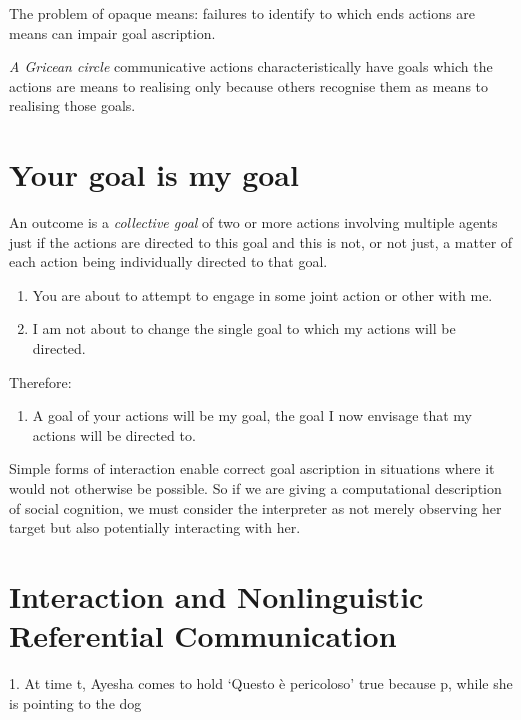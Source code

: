 \documentclass[12pt]{extarticle}
\begin{document}
\begin{multicols*}{3}
The problem of opaque means:
failures to identify to which ends actions are means can impair goal ascription.

\emph{A Gricean circle}
communicative actions characteristically have  goals which the actions
are means to realising only because others recognise them as
means to realising those goals.



\section{Your goal is my goal}

An outcome is a \emph{collective goal} of two or more actions involving multiple agents
just if the actions are directed to this goal and this is not, or not just, a matter
of each action being individually directed to that goal.

\begin{enumerate}
\label{your_goal_is_my_goal}
\item You are
about to attempt to
engage in some joint action
or other with me.

\item I am not about to change the single goal to which my actions will be directed.

\end{enumerate}
%
Therefore:
%
\begin{enumerate}[resume]
%
\item A goal of your actions will be my goal, the goal I now envisage that my actions will be directed to.
\end{enumerate}

Simple forms of interaction enable correct goal ascription in
situations where it would not otherwise be possible.
So if we are giving a computational description of
social cognition, we must consider the interpreter as not merely
observing her target but also potentially interacting with her.



\section{Interaction and Nonlinguistic Referential Communication}

1. At time t, Ayesha comes to hold ‘Questo è pericoloso’ true because p, while she is pointing to the dog


\end{multicols*}
\end{document}
